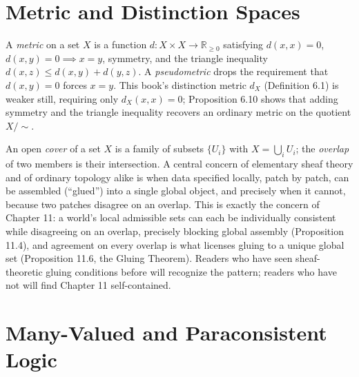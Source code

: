 \documentclass[11pt]{book}
\begin{document}
\section*{Metric and Distinction Spaces}

A \emph{metric} on a set $X$ is a function $d: X \times X \to \mathbb R_{\geq 0}$ satisfying $d(x,x)=0$, $d(x,y)=0 \implies x=y$, symmetry, and the triangle inequality $d(x,z) \leq d(x,y)+d(y,z)$. A \emph{pseudometric} drops the requirement that $d(x,y)=0$ forces $x=y$. This book's distinction metric $d_X$ (Definition 6.1) is weaker still, requiring only $d_X(x,x)=0$; Proposition 6.10 shows that adding symmetry and the triangle inequality recovers an ordinary metric on the quotient $X/\!\sim$.

An open \emph{cover} of a set $X$ is a family of subsets $\{U_i\}$ with $X = \bigcup_i U_i$; the \emph{overlap} of two members is their intersection. A central concern of elementary sheaf theory and of ordinary topology alike is when data specified locally, patch by patch, can be assembled (``glued'') into a single global object, and precisely when it cannot, because two patches disagree on an overlap. This is exactly the concern of Chapter 11: a world's local admissible sets can each be individually consistent while disagreeing on an overlap, precisely blocking global assembly (Proposition 11.4), and agreement on every overlap is what licenses gluing to a unique global set (Proposition 11.6, the Gluing Theorem). Readers who have seen sheaf-theoretic gluing conditions before will recognize the pattern; readers who have not will find Chapter 11 self-contained.

\section*{Many-Valued and Paraconsistent Logic}
\end{document}
